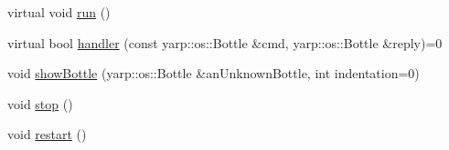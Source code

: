 \begin{DoxyCompactItemize}
\item 
virtual void \hyperlink{class_robot_model_1_1_yarp_rpc_port_a1d70c28615104cd25ce2d2e7b61a592c}{run} ()
\item 
virtual bool \hyperlink{class_robot_model_1_1_yarp_rpc_port_a156879aeb8b6641c0f63a6633af8c568}{handler} (const yarp::os::Bottle \&cmd, yarp::os::Bottle \&reply)=0
\item 
void \hyperlink{class_robot_model_1_1_yarp_rpc_port_abb0330c695bd22838cee0d2578b66d2d}{showBottle} (yarp::os::Bottle \&anUnknownBottle, int indentation=0)
\item 
void \hyperlink{class_robot_model_1_1_yarp_rpc_port_a7c02179416d26e3e741a385cc1320278}{stop} ()
\item 
void \hyperlink{class_robot_model_1_1_yarp_rpc_port_ac72752818661170c795ed1c4c10dcac2}{restart} ()
\end{DoxyCompactItemize}


